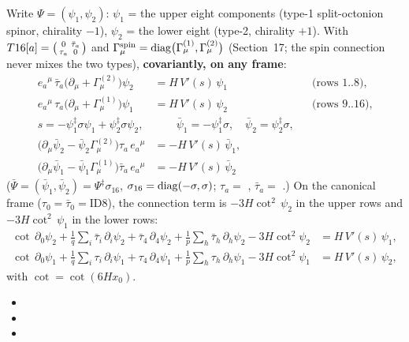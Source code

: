 Write $\Psi=(\psi_1,\psi_2)$: $\psi_1$ = the upper eight components (type-1 split-octonion spinor,
chirality $-1$), $\psi_2$ = the lower eight (type-2, chirality $+1$). With
$T16[a]=\bigl(\begin{smallmatrix}0&\bar\tau_a\\ \tau_a&0\end{smallmatrix}\bigr)$ and
$\Gamma^{\mathrm{spin}}_\mu=\operatorname{diag}\bigl(\Gamma^{(1)}_\mu,\Gamma^{(2)}_\mu\bigr)$ (Section~17; the spin
connection never mixes the two types), \textbf{covariantly, on any frame}:
\begin{align*}
  e_a{}^\mu\,\bar\tau_a\bigl(\partial_\mu+\Gamma^{(2)}_\mu\bigr)\psi_2&=H\,V'(s)\,\psi_1 &&\text{(rows 1..8)},\\
  e_a{}^\mu\,\tau_a\bigl(\partial_\mu+\Gamma^{(1)}_\mu\bigr)\psi_1&=H\,V'(s)\,\psi_2 &&\text{(rows 9..16)},\\
  s=-\psi_1^{\ddagger}\sigma\psi_1+\psi_2^{\ddagger}\sigma\psi_2,&\qquad \bar\psi_1=-\psi_1^{\ddagger}\sigma,\quad \bar\psi_2=\psi_2^{\ddagger}\sigma,\\
  \bigl(\partial_\mu\bar\psi_2-\bar\psi_2\Gamma^{(2)}_\mu\bigr)\tau_a\,e_a{}^\mu&=-H\,V'(s)\,\bar\psi_1,\\
  \bigl(\partial_\mu\bar\psi_1-\bar\psi_1\Gamma^{(1)}_\mu\bigr)\bar\tau_a\,e_a{}^\mu&=-H\,V'(s)\,\bar\psi_2
\end{align*}
($\bar\Psi=(\bar\psi_1,\bar\psi_2)=\Psi^{\ddagger}\sigma_{16}$, $\sigma_{16}=\operatorname{diag}(-\sigma,\sigma)$;
$\tau_a=$ , $\bar\tau_a=$ .) On the canonical frame
($\tau_0=\bar\tau_0=\mathrm{ID8}$), the connection term is $-3H\cot^2\,\psi_2$ in the upper rows and
$-3H\cot^2\,\psi_1$ in the lower rows:
\begin{align*}
  \cot\,\partial_0\psi_2+\frac1q\sum_i\bar\tau_i\,\partial_i\psi_2+\bar\tau_4\,\partial_4\psi_2+\frac1p\sum_h\bar\tau_h\,\partial_h\psi_2-3H\cot^2\psi_2&=H\,V'(s)\,\psi_1,\\
  \cot\,\partial_0\psi_1+\frac1q\sum_i\tau_i\,\partial_i\psi_1+\tau_4\,\partial_4\psi_1+\frac1p\sum_h\tau_h\,\partial_h\psi_1-3H\cot^2\psi_1&=H\,V'(s)\,\psi_2 ,
\end{align*}
with $\cot=\cot(6Hx_0)$. 
\begin{itemize}
  \item {}
  \item {}
  \item {}
\end{itemize}

